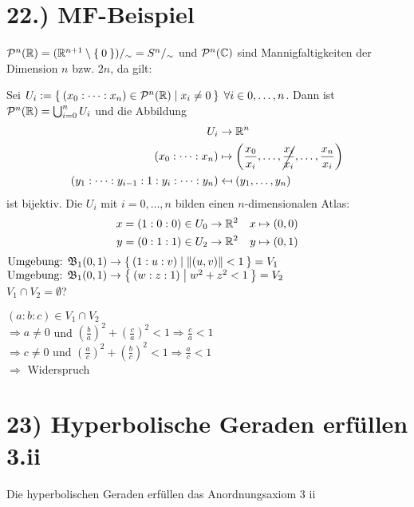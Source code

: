 \documentclass[a5paper,oneside]{scrbook}
\begin{document}

\section*{22.) MF-Beispiel}
$\mathcal{P}^n(\mathbb{R}) = (\mathbb{R}^{n+1} \setminus \Set{0})/_\sim = S^n /_\sim$ und $\mathcal{P}^n(\mathbb{C})$ sind Mannigfaltigkeiten
der Dimension $n$ bzw. $2n$, da gilt:

Sei $U_i := \Set{(x_0: \dots : x_n) \in \ensuremath{\mathcal{P}}^n(\ensuremath{\mathbb{R}}) | x_i \neq 0}\;\forall i \in 0, \dots, n$.
Dann ist $\mathcal{P}^n(\mathbb{R}) = \bigcup_{i=0}^n U_i$ und die Abbildung
\begin{align*}
  U_i &\rightarrow \mdr^n\\
  (x_0 : \dots : x_n) &\mapsto \left (\frac{x_0}{x_i}, \dots, \cancel{\frac{x_i}{x_i}}, \dots, \frac{x_n}{x_i} \right )\\
  (y_1 : \dots : y_{i-1} : 1 : y_i : \dots : y_n) &\mapsfrom (y_1, \dots, y_n)
\end{align*}
ist bijektiv.
Die $U_i$ mit $i = 0, \dots, n$ bilden einen $n$-dimensionalen Atlas:
\begin{align*}
        x &= (1:0:0) \in U_0 \rightarrow \mathbb{R}^2 & x &\mapsto (0,0)\\
        y &= (0:1:1) \in U_2 \rightarrow \mathbb{R}^2 & y &\mapsto (0,1)
\end{align*}
$\text{Umgebung: } \mathfrak{B}_1 (0,1) \rightarrow \Set{(1:u:v) | \|(u,v)\| < 1} = V_1$\\
$\text{Umgebung: } \mathfrak{B}_1 (0,1) \rightarrow \Set{(w:z:1) | w^2 + z^2 < 1} = V_2$\\

$V_1 \cap V_2 = \emptyset$?

$(a:b:c) \in V_1 \cap V_2$\\
$\Rightarrow a \neq 0$ und $(\frac{b}{a})^2 + (\frac{c}{a})^2 < 1 \Rightarrow \frac{c}{a} < 1$\\
$\Rightarrow c \neq 0$ und $(\frac{a}{c})^2 + (\frac{b}{c})^2 < 1 \Rightarrow \frac{a}{c} < 1$\\
$\Rightarrow$ Widerspruch


\section*{23) Hyperbolische Geraden erfüllen 3.ii}
\begin{bemerkung}
    Die hyperbolischen Geraden erfüllen das Anordnungsaxiom 3 ii
\end{bemerkung}
\end{document}
